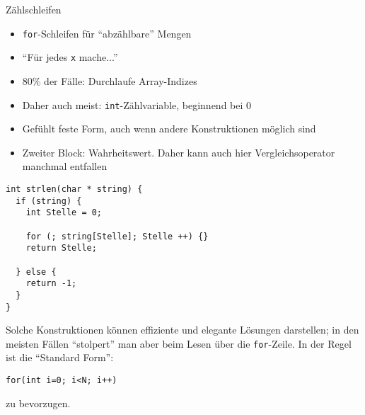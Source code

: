 
\begin{frame}{Zählschleifen}
%
\begin{itemize}
\item \texttt{for}-Schleifen für \enquote{abzählbare} Mengen
\item \enquote{Für jedes \texttt{x} mache...}
\item 80\% der Fälle: Durchlaufe Array-Indizes
\item Daher auch meist: \texttt{int}-Zählvariable, beginnend bei 0
\item Gefühlt feste Form, auch wenn andere Konstruktionen möglich sind
\item Zweiter Block: Wahrheitswert. Daher kann auch hier Vergleichsoperator manchmal entfallen
\end{itemize}
%
\end{frame}


\begin{frame}[fragile]
%
%
\begin{codebox}[Beispiel: \texttt{strlen} mit \texttt{for}, equal height group=B]
\begin{verbatim}
int strlen(char * string) {
  if (string) {
    int Stelle = 0;
    
    for (; string[Stelle]; Stelle ++) {}
    return Stelle;
    
  } else {
    return -1;
  }
}
\end{verbatim}
\end{codebox}
%
\begin{hintbox}[Tipp, equal height group=B]
\small
Solche Konstruktionen können effiziente und elegante Lösungen darstellen; in den meisten Fällen \enquote{stolpert} man aber beim Lesen über die \texttt{for}-Zeile. In der Regel ist die \enquote{Standard Form}:
\begin{center}
\texttt{for(int i=0; i<N; i++)}
\end{center}
zu bevorzugen.
\end{hintbox}
%
%
\end{frame}



